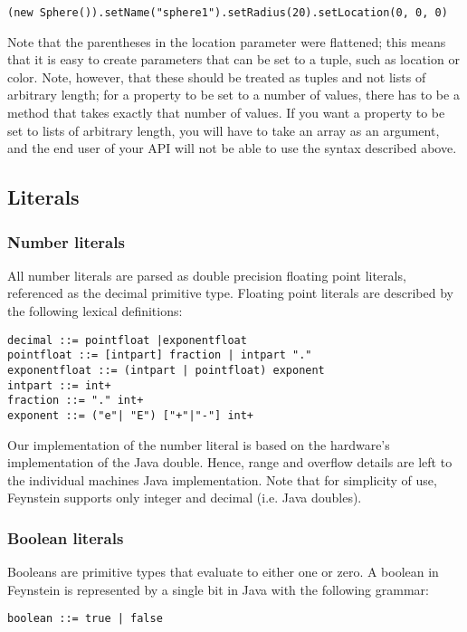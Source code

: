 \documentclass[letterpaper]{article}
\begin{document}
\begin{verbatim}
(new Sphere()).setName("sphere1").setRadius(20).setLocation(0, 0, 0)
\end{verbatim}

Note that the parentheses in the location parameter were flattened;
this means that it is easy to create parameters that can be set to a
tuple, such as location or color. Note, however, that these should be
treated as tuples and not lists of arbitrary length; for a property to
be set to a number of values, there has to be a method that takes
exactly that number of values. If you want a property to be set to
lists of arbitrary length, you will have to take an array as an
argument, and the end user of your API will not be able to use the
syntax described above.

\subsection{Literals}
 
\subsubsection{Number literals}
\label{sec:numliterals}
All number literals are parsed as double precision floating point
literals, referenced as the decimal primitive type. Floating point
literals are described by the following lexical definitions:

\begin{verbatim}
decimal ::= pointfloat |exponentfloat
pointfloat ::= [intpart] fraction | intpart "."
exponentfloat ::= (intpart | pointfloat) exponent
intpart ::= int+
fraction ::= "." int+
exponent ::= ("e"| "E") ["+"|"‐"] int+
\end{verbatim}

Our implementation of the number literal is based on the hardware's
implementation of the Java double. Hence, range and overflow details
are left to the individual machines Java implementation. Note that for
simplicity of use, Feynstein supports only integer and decimal
(i.e. Java doubles).
 
\subsubsection{Boolean literals}
Booleans are primitive types that evaluate to either one or zero. A
boolean in Feynstein is represented by a single bit in Java with the
following grammar:

\begin{verbatim}
boolean ::= true | false
\end{verbatim}
\end{document}
